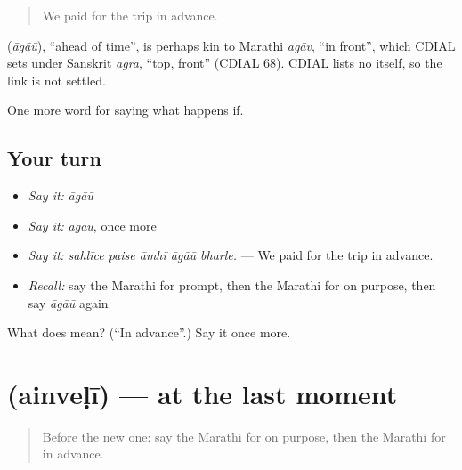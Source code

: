 \begin{quote}
We paid for the trip in advance.
\end{quote}

\begin{cousinweb}
\textbf{} (\emph{āgāū}), \textquotedblleft{}ahead of time\textquotedblright{}, is perhaps kin to Marathi \emph{agāv}, \textquotedblleft{}in front\textquotedblright{}, which CDIAL sets under Sanskrit \emph{agra}, \textquotedblleft{}top, front\textquotedblright{} (CDIAL 68). CDIAL lists no  itself, so the link is not settled.
\end{cousinweb}

\begin{grammarlens}[title={What you've built}]
One more word for saying what happens if.
\end{grammarlens}

\subsection*{Your turn}
\begin{itemize}
\raggedright
  \item \emph{Say it:} \emph{āgāū}
  \item \emph{Say it:} \emph{āgāū}, once more
  \item \emph{Say it:} \emph{sahlīce paise āmhī āgāū bharle.} — We paid for the trip in advance.
  \item \emph{Recall:} say the Marathi for prompt, then the Marathi for on purpose, then say \emph{āgāū} again
\end{itemize}

\begin{tcolorbox}[breakable,colback=teal!4,colframe=teal!35!black,title={Before you move on}]
What does  mean? (\textquotedblleft{}In advance\textquotedblright{}.) Say it once more.
\end{tcolorbox}
\section[\texorpdfstring{\mr{ऐनवेळी} (ainveḷī)}{ऐनवेळी (ainveḷī)}]{ (ainveḷī) — at the last moment}

\label{lesson:MR-C554-ainveli}



\begin{quote}
Before the new one: say the Marathi for on purpose, then the Marathi for in advance.
\end{quote}


